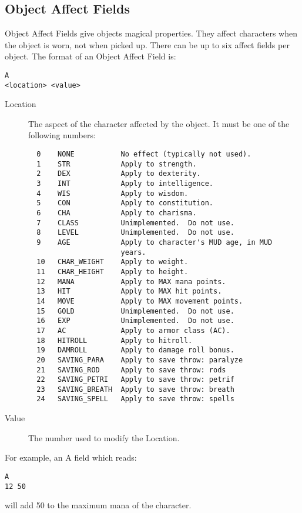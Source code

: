 \documentclass[11pt]{article}
\begin{document}
\subsection{Object Affect Fields}
Object Affect Fields give objects magical properties.  They affect characters when the object is worn, not when picked up.  There can be up to six affect fields per object.\newline
The format of an Object Affect Field is:
\begin{verbatim}
A
<location> <value>
\end{verbatim}
\begin{description}
\item[Location] The aspect of the character affected by the object.  It must be one of the following numbers:
\begin{verbatim}
  0    NONE           No effect (typically not used).
  1    STR            Apply to strength.
  2    DEX            Apply to dexterity.
  3    INT            Apply to intelligence.
  4    WIS            Apply to wisdom.
  5    CON            Apply to constitution.
  6    CHA            Apply to charisma.
  7    CLASS          Unimplemented.  Do not use.
  8    LEVEL          Unimplemented.  Do not use.
  9    AGE            Apply to character's MUD age, in MUD
                      years.
  10   CHAR_WEIGHT    Apply to weight.
  11   CHAR_HEIGHT    Apply to height.
  12   MANA           Apply to MAX mana points.
  13   HIT            Apply to MAX hit points.
  14   MOVE           Apply to MAX movement points.
  15   GOLD           Unimplemented.  Do not use.
  16   EXP            Unimplemented.  Do not use.
  17   AC             Apply to armor class (AC).
  18   HITROLL        Apply to hitroll.
  19   DAMROLL        Apply to damage roll bonus.
  20   SAVING_PARA    Apply to save throw: paralyze
  21   SAVING_ROD     Apply to save throw: rods
  22   SAVING_PETRI   Apply to save throw: petrif
  23   SAVING_BREATH  Apply to save throw: breath
  24   SAVING_SPELL   Apply to save throw: spells
\end{verbatim}
\item[Value] The number used to modify the Location.
\end{description}
For example, an A field which reads:
\begin{verbatim}
A
12 50
\end{verbatim}
will add 50 to the maximum mana of the character.
\end{document}
